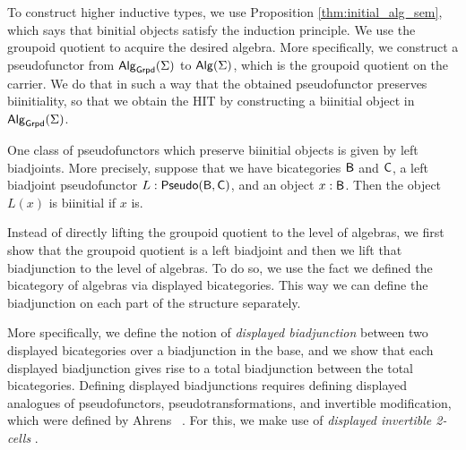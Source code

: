 To construct higher inductive types, we use Proposition \ref{thm:initial_alg_sem}, which says that binitial objects satisfy the induction principle.
We use the groupoid quotient to acquire the desired algebra.
More specifically, we construct a pseudofunctor from $\mathsf{Alg}_{\mathsf{Grpd}}(\Sigma)$ to $\mathsf{Alg}(\Sigma)$,
which is the groupoid quotient on the carrier.
We do that in such a way that the obtained pseudofunctor preserves biinitiality,
so that we obtain the HIT by constructing a biinitial object in $\mathsf{Alg}_{\mathsf{Grpd}}(\Sigma)$.

One class of pseudofunctors which preserve biinitial objects is given by left biadjoints.
More precisely, suppose that we have bicategories $\mathsf{B}$ and $\mathsf{C}$, a left biadjoint pseudofunctor $L : \mathsf{Pseudo}(\mathsf{B}, \mathsf{C})$, and an object $x : \mathsf{B}$.
Then the object $L(x)$ is biinitial if $x$ is.

Instead of directly lifting the groupoid quotient to the level of algebras,
we first show that the groupoid quotient is a left biadjoint and then we lift that biadjunction to the level of algebras.
To do so, we use the fact we defined the bicategory of algebras via displayed bicategories.
This way we can define the biadjunction on each part of the structure separately.

More specifically, we define the notion of \emph{displayed biadjunction} between two displayed bicategories over a biadjunction in the base,
and we show that each displayed biadjunction gives rise to a total biadjunction between the total bicategories.
Defining displayed biadjunctions requires defining displayed analogues of pseudofunctors, pseudotransformations, and invertible modification,
which were defined by Ahrens \etal \ \cite{bicatjournal}.
For this, we make use of \emph{displayed invertible 2-cells} \cite{bicatjournal}.

